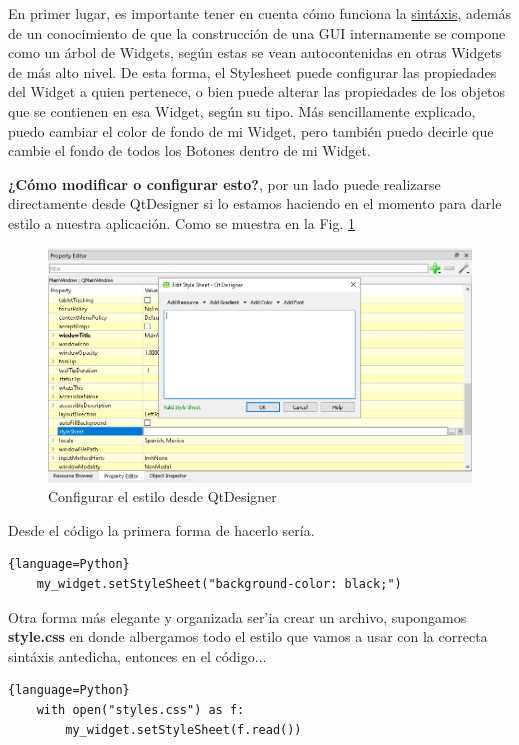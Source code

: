 En primer lugar, es importante tener en cuenta c\'omo funciona la \href{https://doc.qt.io/qt-5/stylesheet-syntax.html}{sint\'axis},
adem\'as de un conocimiento de que la construcci\'on de una GUI internamente se compone como un \'arbol de Widgets, seg\'un estas se vean autocontenidas en otras
Widgets de m\'as alto nivel. De esta forma, el Stylesheet puede configurar las propiedades del Widget a quien pertenece, o bien puede alterar las propiedades
de los objetos que se contienen en esa Widget, seg\'un su tipo.
M\'as sencillamente explicado, puedo cambiar el color de fondo de mi Widget, pero tambi\'en puedo decirle que cambie el fondo de todos los Botones dentro de mi Widget.

\textbf{¿C\'omo modificar o configurar esto?}, por un lado puede realizarse directamente desde QtDesigner si lo estamos haciendo en el momento para darle estilo
a nuestra aplicaci\'on. Como se muestra en la Fig. \ref{fig:qt_stylesheet_image}

\begin{figure}[H]
    \centering
    \includegraphics[scale=0.5]{imagenes/qtdesigner/stylesheets.PNG}
    \caption{Configurar el estilo desde QtDesigner}
    \label{fig:qt_stylesheet_image}
\end{figure}

Desde el c\'odigo la primera forma de hacerlo ser\'ia.

\begin{lstlisting}{language=Python}
    my_widget.setStyleSheet("background-color: black;")
\end{lstlisting}

Otra forma m\'as elegante y organizada ser'ia crear un archivo, supongamos \textbf{style.css} en donde
albergamos todo el estilo que vamos a usar con la correcta sint\'axis antedicha, entonces en el c\'odigo...

\begin{lstlisting}{language=Python}
    with open("styles.css") as f:
        my_widget.setStyleSheet(f.read())
\end{lstlisting}
